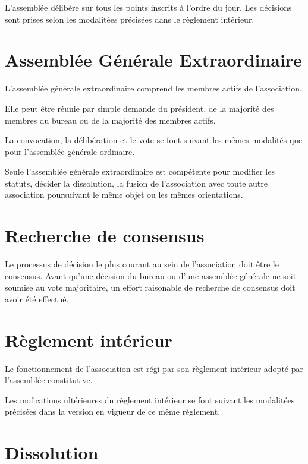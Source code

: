 \documentclass[a4paper, 11pt]{article}
\begin{document}
L'assemblée délibère sur tous les points inscrits à l'ordre du jour. Les décisions sont prises selon les modalitées
précisées dans le règlement intérieur.


\section{Assemblée Générale Extraordinaire} %

L'assemblée générale extraordinaire comprend les membres actifs de l'association.

Elle peut être réunie par simple demande du président, de la majorité des membres du bureau ou de la majorité des
membres actifs.

La convocation, la délibération et le vote se font suivant les mêmes modalités que pour l'assemblée générale ordinaire.

Seule l'assemblée générale extraordinaire est compétente pour modifier les statuts, décider la dissolution, la fusion de
l'association avec toute autre association poursuivant le même objet ou les mêmes orientations.


\section{Recherche de consensus} %

Le processus de décision le plus courant au sein de l'association doit être le consensus. Avant qu'une décision du
bureau ou d'une assemblée générale ne soit soumise au vote majoritaire, un effort raisonable de recherche de consensus
doit avoir été effectué.


\section{Règlement intérieur} %

Le fonctionnement de l'association est régi par son règlement intérieur adopté par l'assemblée constitutive.

Les mofications ultérieures du règlement intérieur se font suivant les modalitées précisées dans la version en vigueur
de ce même règlement.


\section{Dissolution} %
\end{document}
